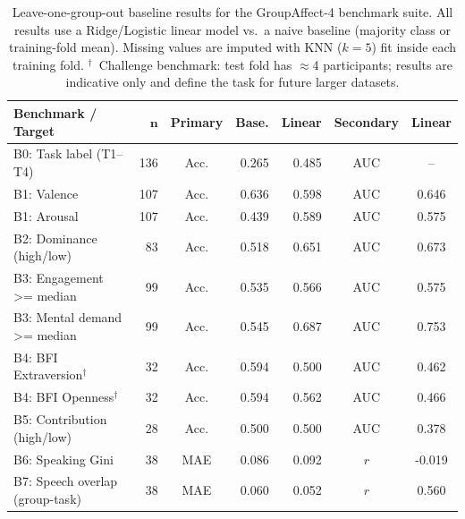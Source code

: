\begin{table}[t]
  \centering
  \caption{Leave-one-group-out baseline results for the
    GroupAffect-4 benchmark suite. All results use a Ridge/Logistic linear model
    vs.\ a naive baseline (majority class or training-fold mean). Missing
    values are imputed with KNN ($k=5$) fit inside each training fold.
    $^\dag$~Challenge benchmark: test fold has $\approx$4 participants;
    results are indicative only and define the task for future larger datasets.}
  \label{tab:benchmark_baselines}
  \small
  \setlength{\tabcolsep}{4pt}
  \begin{tabular}{lrcrrcc}
    \toprule
    \textbf{Benchmark / Target} & $\bm{n}$ & \textbf{Primary} & \textbf{Base.} & \textbf{Linear} & \textbf{Secondary} & \textbf{Linear} \\
    \midrule
    B0: Task label (T1--T4) & 136 & Acc. & 0.265 & 0.485 & AUC & -- \\
    \addlinespace[2pt]
    B1: Valence & 107 & Acc. & 0.636 & 0.598 & AUC & 0.646 \\
    B1: Arousal & 107 & Acc. & 0.439 & 0.589 & AUC & 0.575 \\
    \addlinespace[2pt]
    B2: Dominance (high/low) & 83 & Acc. & 0.518 & 0.651 & AUC & 0.673 \\
    \addlinespace[2pt]
    B3: Engagement >= median & 99 & Acc. & 0.535 & 0.566 & AUC & 0.575 \\
    B3: Mental demand >= median & 99 & Acc. & 0.545 & 0.687 & AUC & 0.753 \\
    \addlinespace[2pt]
    B4: BFI Extraversion$^\dag$ & 32 & Acc. & 0.594 & 0.500 & AUC & 0.462 \\
    B4: BFI Openness$^\dag$ & 32 & Acc. & 0.594 & 0.562 & AUC & 0.466 \\
    \addlinespace[2pt]
    B5: Contribution (high/low) & 28 & Acc. & 0.500 & 0.500 & AUC & 0.378 \\
    \addlinespace[2pt]
    B6: Speaking Gini & 38 & MAE & 0.086 & 0.092 & $r$ & -0.019 \\
    \addlinespace[2pt]
    B7: Speech overlap (group-task) & 38 & MAE & 0.060 & 0.052 & $r$ & 0.560 \\
    \bottomrule
  \end{tabular}
\end{table}
